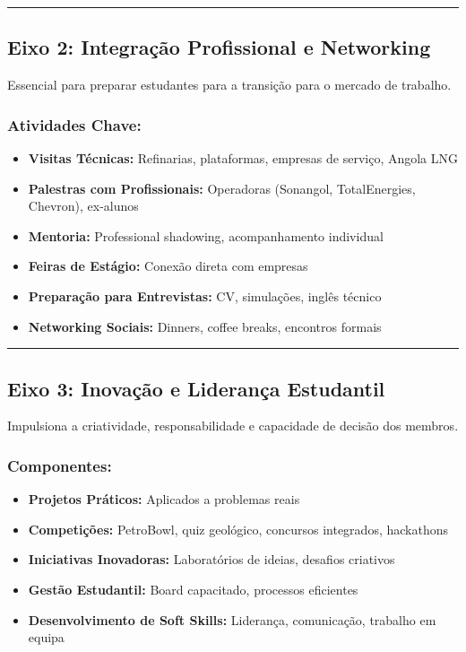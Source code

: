 \documentclass[12pt,a4paper]{article}
\begin{document}
\textcolor{spe-secondary}{\hspace{0.5cm}\rule{0.4\linewidth}{0.8pt}}
\subsection{Eixo 2: Integração Profissional e Networking}

Essencial para preparar estudantes para a transição para o mercado de trabalho.

\subsubsection*{Atividades Chave:}
\begin{itemize}[itemsep=0.2cm]
    \item \textbf{Visitas Técnicas:} Refinarias, plataformas, empresas de serviço, Angola LNG
    \item \textbf{Palestras com Profissionais:} Operadoras (Sonangol, TotalEnergies, Chevron), ex-alunos
    \item \textbf{Mentoria:} Professional shadowing, acompanhamento individual
    \item \textbf{Feiras de Estágio:} Conexão direta com empresas
    \item \textbf{Preparação para Entrevistas:} CV, simulações, inglês técnico
    \item \textbf{Networking Sociais:} Dinners, coffee breaks, encontros formais
\end{itemize}

\textcolor{spe-secondary}{\hspace{0.5cm}\rule{0.4\linewidth}{0.8pt}}
\subsection{Eixo 3: Inovação e Liderança Estudantil}

Impulsiona a criatividade, responsabilidade e capacidade de decisão dos membros.

\subsubsection*{Componentes:}
\begin{itemize}[itemsep=0.2cm]
    \item \textbf{Projetos Práticos:} Aplicados a problemas reais
    \item \textbf{Competições:} PetroBowl, quiz geológico, concursos integrados, hackathons
    \item \textbf{Iniciativas Inovadoras:} Laboratórios de ideias, desafios criativos
    \item \textbf{Gestão Estudantil:} Board capacitado, processos eficientes
    \item \textbf{Desenvolvimento de Soft Skills:} Liderança, comunicação, trabalho em equipa
\end{itemize}
\end{document}
